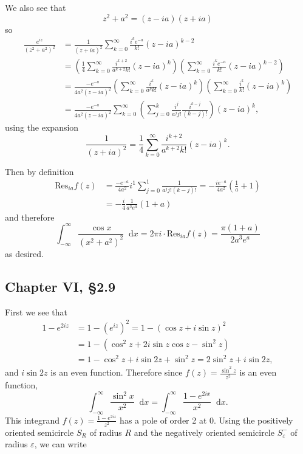 \documentclass{article}
\newcommand\Res{\mathrm{Res}}
\newcommand\dif{\mathop{}\!\mathrm{d}}
\begin{document}
We also see that
$$
   z^2 + a^2
 = (z - ia)(z + ia)
$$
so
\begin{align*}
   \frac{e^{iz}}{(z^2 + a^2)^2}
&= \frac{1}{(z + ia)^2}
   \sum_{k=0}^\infty
     \frac{i^k e^{-a}}{k!}
     (z - ia)^{k-2} \\
&= \left(
     \frac{1}{4}
     \sum_{k=0}^\infty
       \frac{i^{k+2}}{a^{k+2} k!}
       (z - ia)^k
   \right)
   \left(
     \sum_{k=0}^\infty
       \frac{i^k e^{-a}}{k!}
       (z - ia)^{k-2}
   \right) \\
&= \frac{-e^{-a}}{4a^2 (z - ia)^2}
   \left(
     \sum_{k=0}^\infty
       \frac{i^k}{a^k k!}
       (z - ia)^k
   \right)
   \left(
     \sum_{k=0}^\infty
       \frac{i^k}{k!}
       (z - ia)^{k}
   \right) \\
&= \frac{-e^{-a}}{4a^2 (z - ia)^2}
   \sum_{k=0}^\infty
     \left(
       \sum_{j=0}^k
         \frac{i^j}
              {a^j j!}
         \frac{i^{k-j}}
              {(k - j)!}
     \right)
     (z - ia)^k,
\end{align*}
using the expansion
$$
  \frac{1}{(z + ia)^2}
= \frac{1}{4}
     \sum_{k=0}^\infty
       \frac{i^{k+2}}{a^{k+2} k!}
       (z - ia)^k.
$$

Then by definition
\begin{align*}
   \Res_{ia} f(z)
&= \frac{-e^{-a}}{4a^2}
   i^1
   \sum_{j=0}^1
     \frac{1}
          {a^j j! (k - j)!}
 = -\frac{i e^{-a}}{4a^2}
   \left(
     \frac{1}{a} + 1
   \right) \\
&= -\frac{i}{4}
   \frac{1}{a^3 e^a}
    (1 + a)
\end{align*}
and therefore
$$
  \int_{-\infty}^\infty
    \frac{\cos x}
         {(x^2 + a^2)^2}
    \dif x
= 2 \pi i \cdot \Res_{ia} f(z)
= \frac{\pi (1 + a)}
       {2 a^3 e^a}
$$
as desired.

\subsection*{Chapter VI, \S 2.9}
First we see that
\begin{align*}
   1 - e^{2 i z}
&= 1 - (e^{iz})^2
 = 1 - (\cos z + i \sin z)^2 \\
&= 1 - (\cos^2 z + 2 i \sin z \cos z - \sin^2 z) \\
&= 1 - \cos^2 z + i \sin 2z + \sin^2 z
 = 2 \sin^2 z + i \sin 2z,
\end{align*}
and $i \sin 2z$ is an even function. Therefore since
$f(z) = \frac{\sin^2 z}{z^2}$ is an even function,
$$
  \int_{-\infty}^\infty
    \frac{\sin^2 x}{x^2}
    \dif x
= \int_{-\infty}^\infty
    \frac{1 - e^{2ix}}{x^2}
    \dif x.
$$
This integrand $f(z) = \frac{1 - e^{2 i z}}{z^2}$
has a pole of order 2 at 0.
Using the positively oriented semicircle $S_R$ of radius $R$
and the negatively oriented semicircle $S_\varepsilon^{-}$ of radius
$\varepsilon$, we can write
\end{document}

